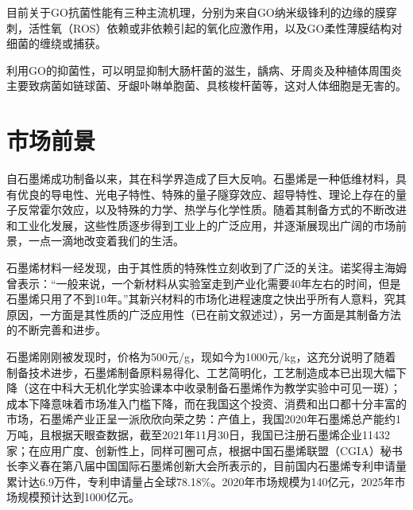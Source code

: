 目前关于GO抗菌性能有三种主流机理，分别为来自GO纳米级锋利的边缘的膜穿刺，活性氧（ROS）依赖或非依赖引起的氧化应激作用，以及GO柔性薄膜结构对细菌的缠绕或捕获。

利用GO的抑菌性，可以明显抑制大肠杆菌的滋生，龋病、牙周炎及种植体周围炎主要致病菌如链球菌、牙龈卟啉单胞菌、具核梭杆菌等，这对人体细胞是无害的。

\section{市场前景}

自石墨烯成功制备以来，其在科学界造成了巨大反响。石墨烯是一种低维材料，具有优良的导电性、光电子特性、特殊的量子隧穿效应、超导特性、理论上存在的量子反常霍尔效应，以及特殊的力学、热学与化学性质。随着其制备方式的不断改进和工业化发展，这些性质逐步得到工业上的广泛应用，并逐渐展现出广阔的市场前景，一点一滴地改变着我们的生活。

石墨烯材料一经发现，由于其性质的特殊性立刻收到了广泛的关注。诺奖得主海姆曾表示：“一般来说，一个新材料从实验室走到产业化需要40年左右的时间，但是石墨烯只用了不到10年。”其新兴材料的市场化进程速度之快出乎所有人意料，究其原因，一方面是其性质的广泛应用性（已在前文叙述过），另一方面是其制备方法的不断完善和进步。

石墨烯刚刚被发现时，价格为500元/g，现如今为1000元/kg，这充分说明了随着制备技术进步，石墨烯制备原料易得化、工艺简明化，工艺制造成本已出现大幅下降（这在中科大无机化学实验课本中收录制备石墨烯作为教学实验中可见一斑）；成本下降意味着市场准入门槛下降，而在我国这个投资、消费和出口都十分丰富的市场，石墨烯产业正呈一派欣欣向荣之势：产值上，我国2020年石墨烯总产能约1万吨，且根据天眼查数据，截至2021年11月30日，我国已注册石墨烯企业11432家；在应用广度、创新性上，同样可圈可点，根据中国石墨烯联盟（CGIA）秘书长李义春在第八届中国国际石墨烯创新大会所表示的，目前国内石墨烯专利申请量累计达6.9万件，专利申请量占全球78.18\%。2020年市场规模为140亿元，2025年市场规模预计达到1000亿元。

